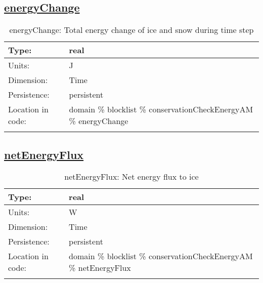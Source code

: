 \subsection[energyChange]{\hyperref[sec:var_tab_conservationCheckEnergyAM]{energyChange}}
\label{subsec:var_sec_conservationCheckEnergyAM_energyChange}
\begin{center}
\begin{longtable}{| p{2.0in} | p{4.0in} |}
        \hline 
        Type: & real \\
        \hline 
        Units: & \si{J} \\
        \hline 
        Dimension: & Time \\
        \hline 
        Persistence: & persistent \\
        \hline 
         Location in code: & domain \% blocklist \% conservationCheckEnergyAM \% energyChange \\
         \hline 
    \caption{energyChange: Total energy change of ice and snow during time step}
\end{longtable}
\end{center}
\subsection[netEnergyFlux]{\hyperref[sec:var_tab_conservationCheckEnergyAM]{netEnergyFlux}}
\label{subsec:var_sec_conservationCheckEnergyAM_netEnergyFlux}
\begin{center}
\begin{longtable}{| p{2.0in} | p{4.0in} |}
        \hline 
        Type: & real \\
        \hline 
        Units: & \si{W} \\
        \hline 
        Dimension: & Time \\
        \hline 
        Persistence: & persistent \\
        \hline 
         Location in code: & domain \% blocklist \% conservationCheckEnergyAM \% netEnergyFlux \\
         \hline 
    \caption{netEnergyFlux: Net energy flux to ice}
\end{longtable}
\end{center}
